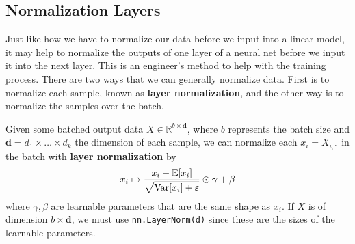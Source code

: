   \subsection{Normalization Layers} 

    Just like how we have to normalize our data before we input into a linear model, it may help to normalize the outputs of one layer of a neural net before we input it into the next layer. This is an engineer's method to help with the training process. There are two ways that we can generally normalize data. First is to normalize each sample, known as \textbf{layer normalization}, and the other way is to normalize the samples over the batch. 

    \begin{definition}
      Given some batched output data $X \in \mathbb{R}^{b \times \mathbf{d}}$, where $b$ represents the batch size and $\mathbf{d} = d_1 \times \ldots \times d_k$ the dimension of each sample, we can normalize each $x_i = X_{i, :}$ in the batch with \textbf{layer normalization} by 
      \begin{equation}
        x_i \mapsto \frac{x_i - \mathbb{E}[x_i]}{\sqrt{\Var[x_i] + \varepsilon}} \odot \gamma + \beta
      \end{equation}
      where $\gamma, \beta$ are learnable parameters that are the same shape as $x_i$. If $X$ is of dimension $b \times \mathbf{d}$, we must use \texttt{nn.LayerNorm(d)} since these are the sizes of the learnable parameters. 
    \end{definition}

